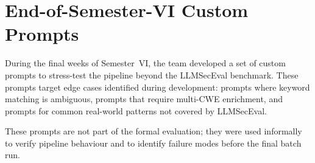 \documentclass[12pt,a4paper]{report}
\begin{document}
\chapter{End-of-Semester-VI Custom Prompts}
\label{app:customprompts}

During the final weeks of Semester~VI, the team developed a set of custom
prompts to stress-test the pipeline beyond the LLMSecEval benchmark. These
prompts target edge cases identified during development: prompts where keyword
matching is ambiguous, prompts that require multi-CWE enrichment, and prompts
for common real-world patterns not covered by LLMSecEval.

These prompts are not part of the formal evaluation; they were used informally
to verify pipeline behaviour and to identify failure modes before the final
batch run.
\end{document}
